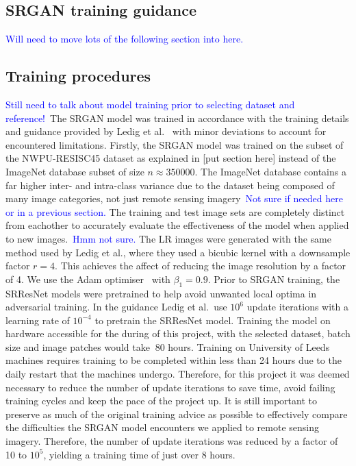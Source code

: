 \subsection{SRGAN training guidance}
\textcolor{blue}{Will need to move lots of the following section into here.}

\subsection{Training procedures}
\textcolor{blue}{Still need to talk about model training prior to selecting dataset and reference!}\ The SRGAN model was trained in accordance with the training details and guidance provided by Ledig et al.~\cite{srgan} with minor deviations to account for encountered limitations. Firstly, the SRGAN model was trained on the subset of the NWPU-RESISC45 dataset as explained in [put section here] instead of the ImageNet database subset of size $n \approx 350000$. The ImageNet database contains a far higher inter- and intra-class variance due to the dataset being composed of many image categories, not just remote sensing imagery\ \textcolor{blue}{Not sure if needed here or in a previous section.} The training and test image sets are completely distinct from eachother to accurately evaluate the effectiveness of the model when applied to new images.\ \textcolor{blue}{Hmm not sure.} The LR images were generated with the same method used by Ledig et al., where they used a bicubic kernel with a downsample factor $r=4$. This achieves the affect of reducing the image resolution by a factor of 4. We use the Adam optimiser~\cite{ref} with $\beta_1 = 0.9$. Prior to SRGAN training, the SRResNet models were pretrained to help avoid unwanted local optima in adversarial training. In the guidance Ledig et al.\ use $10^6$ update iterations with a learning rate of $10^{-4}$ to pretrain the SRResNet model. Training the model on hardware accessible for the during of this project, with the selected dataset, batch size and image patches would take $~80$ hours. Training on University of Leeds machines requires training to be completed within less than 24 hours due to the daily restart that the machines undergo. Therefore, for this project it was deemed necessary to reduce the number of update iterations to save time, avoid failing training cycles and keep the pace of the project up. It is still important to preserve as much of the original training advice as possible to effectively compare the difficulties the SRGAN model encounters we applied to remote sensing imagery. Therefore, the number of update iterations was reduced by a factor of 10 to $10^5$, yielding a training time of just over 8 hours.

